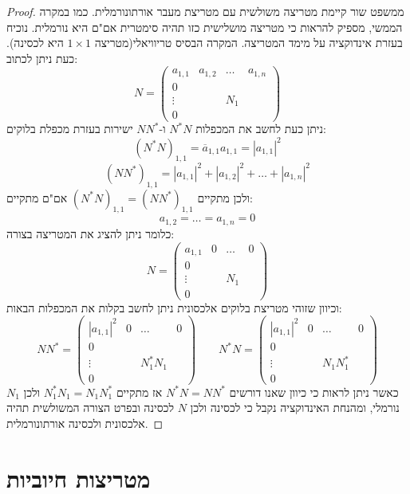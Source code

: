 \documentclass{tstextbook}
\begin{document}
\begin{proof}
ממשפט שור קיימת מטריצה משולשית עם מטריצת מעבר אורתונורמלית. כמו במקרה הממשי, מספיק להראות כי מטריצה מושלישית כזו תהיה סימטרית אם"ם היא נורמלית. נוכיח בעזרת אינדוקציה על מימד המטריצה. המקרה הבסיס טריוויאלי(מטריצה \(1\times1\) היא לכסינה). כעת ניתן לכתוב:
$$N=\left(\begin{array}{c|ccc} a_{1,1} & a_{1,2}  & \dots & a_{1,n} \\\hline 0 &  &  &  \\\vdots &  & N_{1} &  \\0 &  &  & 
\end{array}\right)$$
ניתן כעת לחשב את המכפלות \(N^{*}N\) ו-\(N N^{*}\) ישירות בעזרת מכפלת בלוקים:
$$(N^{*}N)_{1,1}=\overline{{{a}}}_{1,1}a_{1,1}=|a_{1,1}|^{2}$$$$(N N^{*})_{1,1}=|a_{1,1}|^{2}+|a_{1,2}|^{2}+\ldots+|a_{1,n}|^{2}$$
ולכן מתקיים \((N^{*}N)_{1,1}=(N N^{*})_{1,1}\) אם"ם מתקיים:
$$a_{1,2}=\ldots=a_{1,n}=0$$
כלומר ניתן להציג את המטריצה בצורה:
$$N=\left(\begin{array}{c|ccc} a_{1,1} & 0   & \dots & 0 \\\hline 0 &  &  &  \\\vdots &  & N_{1} &  \\0 &  &  & 
\end{array}\right)$$
וכיוון שזוהי מטריצת בלוקים אלכסונית ניתן לחשב בקלות את המכפלות הבאות:
$$NN^{*}=\left(\begin{array}{c|ccc} |a_{1,1}|^{2} & 0  & \dots & 0 \\\hline 0 &  &  &  \\\vdots &  & N_{1}^{*}N_{1} &  \\0 &  &  & \end{array}\right)\qquad N^{*}N=\left(\begin{array}{c|ccc} |a_{1,1}|^{2} & 0  & \dots & 0 \\\hline 0 &  &  &  \\\vdots &  & N_{1}N_{1}^{*} &  \\0 &  &  & 
\end{array}\right)$$
כאשר ניתן לראות כי כיוון שאנו דורשים \(N^{*}N=N N^{*}\) אז מתקיים \(N_{1}^{*}N_{1}=N_{1} N_{1}^{*}\) ולכן \(N_{1}\) נורמלי, ומהנחת האינדוקציה נקבל כי לכסינה ולכן \(N\) לכסינה ובפרט הצורה המשולשית תהיה אלכסונית ולכסינה אורתונורמלית.

\end{proof}
\section{מטריצות חיוביות}
\end{document}
